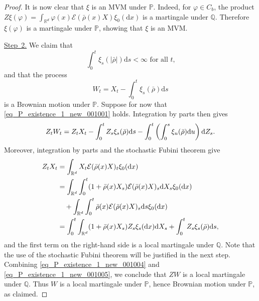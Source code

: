 \documentclass{article}
\theoremstyle{definition}
\numberwithin{equation}{section}
\numberwithin{theorem}{section}
\renewcommand{\P}{\mathbb{P}}
\newcommand{\Q}{\mathbb{Q}}
\newcommand{\R}{\mathbb{R}}
\newcommand{\dx}{\mathrm{d}x}
\newcommand{\ds}{\mathrm{d}s}
\newcommand{\Ec}{\mathcal{E}}
\renewcommand{\d}{{\rm d}}
\renewcommand{\P}{{\mathbb P}}
\begin{document}
\begin{proof}
It is now clear that $\xi$ is an MVM under $\P$. Indeed, for $\varphi\in C_b$, the product $Z \xi(\varphi)=\int_{\R^d} \varphi(x)\Ec(\bar\rho(x)X) \xi_0(\dx)$ is a martingale under $\Q$. Therefore $\xi(\varphi)$ is a martingale under $\P$, showing that $\xi$ is an MVM.



\underline{Step~2.}
We claim that
\begin{equation}\label{eq_P_existence_1_new_001001}
\text{$\int_0^t \xi_s(|\bar\rho|)\ds<\infty$ for all $t$,}
\end{equation}
and that the process
\begin{equation}\label{eq_P_existence_1_new_001}
W_t = X_t - \int_0^t \xi_s(\bar\rho) \ds
\end{equation}
is a Brownian motion under $\P$. Suppose for now that \eqref{eq_P_existence_1_new_001001} holds. Integration by parts then gives
\begin{equation}\label{eq_P_existence_1_new_001004}
Z_t W_t = Z_t X_t - \int_0^t Z_s \xi_s(\bar\rho) \ds - \int_0^t \left( \int_0^s \xi_u(\bar\rho)\d u\right) \d Z_s.
\end{equation}
Moreover, integration by parts and the stochastic Fubini theorem \cite[Theorem~2.2]{ver_12} give
\begin{equation}\label{eq_P_existence_1_new_001005}
\begin{aligned}
Z_tX_t &= \int_{\R^d} X_t \Ec(\bar\rho(x)X)_t \xi_0(\dx) \\
&= \int_{\R^d} \int_0^t ( 1 + \bar\rho(x)X_s )\Ec(\bar\rho(x)X)_s \d X_s \xi_0(\dx) \\
&\quad + \int_{\R^d} \int_0^t \bar\rho(x) \Ec(\bar\rho(x)X)_s \ds \xi_0(\dx)\\
&= \int_0^t  \int_{\R^d} ( 1 + \bar\rho(x)X_s )Z_s\xi_s(\dx) \d X_s + \int_0^t Z_s \xi_s(\bar\rho) \ds,
\end{aligned}
\end{equation}
and the first term on the right-hand side is a local martingale under $\Q$. Note that the use of the stochastic Fubini theorem will be justified in the next step. Combining \eqref{eq_P_existence_1_new_001004} and \eqref{eq_P_existence_1_new_001005}, we conclude that $ZW$ is a local martingale under $\Q$. Thus $W$ is a local martingale under $\P$, hence Brownian motion under $\P$, as claimed.





\end{proof}
\end{document}

